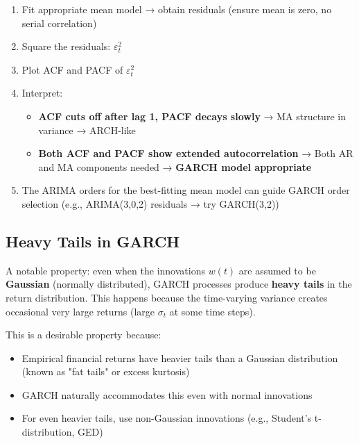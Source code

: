 \documentclass[12pt,openany]{book}
\theoremstyle{definition}
\theoremstyle{remark}
\begin{document}
\begin{enumerate}
\item Fit appropriate mean model → obtain residuals (ensure mean is zero, no serial correlation)


\item Square the residuals: $\varepsilon^2_t$


\item Plot ACF and PACF of $\varepsilon^2_t$


\item Interpret:

\begin{itemize}
\item \textbf{ACF cuts off after lag 1, PACF decays slowly} → MA structure in variance → ARCH-like


\item \textbf{Both ACF and PACF show extended autocorrelation} → Both AR and MA components needed → \textbf{GARCH model appropriate}


\end{itemize}

\item The ARIMA orders for the best-fitting mean model can guide GARCH order selection (e.g., ARIMA(3,0,2) residuals → try GARCH(3,2))


\end{enumerate}
\medskip
\subsection{Heavy Tails in GARCH}
A notable property: even when the innovations ${w(t)}$ are assumed to be \textbf{Gaussian} (normally distributed), GARCH processes produce \textbf{heavy tails} in the return distribution. This happens because the time-varying variance creates occasional very large returns (large $\sigma_t$ at some time steps).

This is a desirable property because:

\begin{itemize}
\item Empirical financial returns have heavier tails than a Gaussian distribution (known as "fat tails" or excess kurtosis)


\item GARCH naturally accommodates this even with normal innovations


\item For even heavier tails, use non-Gaussian innovations (e.g., Student's t-distribution, GED)


\end{itemize}
\medskip
\end{document}
